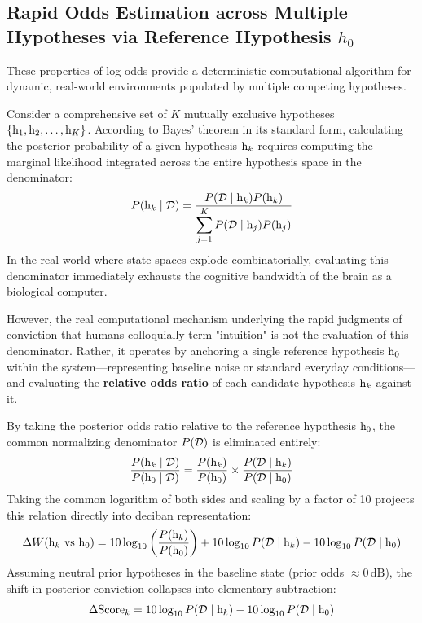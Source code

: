     \subsection{Rapid Odds Estimation across Multiple Hypotheses via Reference Hypothesis $h_0$}

    These properties of log-odds provide a deterministic computational algorithm for dynamic, real-world environments populated by multiple competing hypotheses.

    Consider a comprehensive set of $K$ mutually exclusive hypotheses $\{\mathrm{h}_1, \mathrm{h}_2, \dots, \mathrm{h}_K\}$. According to Bayes' theorem in its standard form, calculating the posterior probability of a given hypothesis $\mathrm{h}_k$ requires computing the marginal likelihood integrated across the entire hypothesis space in the denominator:
    \begin{equation}
        P(\mathrm{h}_k \mid \mathcal{D}) = \frac{P(\mathcal{D} \mid \mathrm{h}_k) P(\mathrm{h}_k)}{\displaystyle\sum_{j=1}^K P(\mathcal{D} \mid \mathrm{h}_j) P(\mathrm{h}_j)}
    \end{equation}
    In the real world where state spaces explode combinatorially, evaluating this denominator immediately exhausts the cognitive bandwidth of the brain as a biological computer.

    However, the real computational mechanism underlying the rapid judgments of conviction that humans colloquially term "intuition" is not the evaluation of this denominator. Rather, it operates by anchoring a single reference hypothesis $\mathrm{h}_0$ within the system—representing baseline noise or standard everyday conditions—and evaluating the \textbf{relative odds ratio} of each candidate hypothesis $\mathrm{h}_k$ against it.

    By taking the posterior odds ratio relative to the reference hypothesis $\mathrm{h}_0$, the common normalizing denominator $P(\mathcal{D})$ is eliminated entirely:
    \begin{equation}
        \frac{P(\mathrm{h}_k \mid \mathcal{D})}{P(\mathrm{h}_0 \mid \mathcal{D})} = \frac{P(\mathrm{h}_k)}{P(\mathrm{h}_0)} \times \frac{P(\mathcal{D} \mid \mathrm{h}_k)}{P(\mathcal{D} \mid \mathrm{h}_0)}
    \end{equation}
    Taking the common logarithm of both sides and scaling by a factor of 10 projects this relation directly into deciban representation:
    \begin{equation}
        \Delta W(\mathrm{h}_k \text{ vs } \mathrm{h}_0) = 10 \log_{10}\left(\frac{P(\mathrm{h}_k)}{P(\mathrm{h}_0)}\right) + 10 \log_{10} P(\mathcal{D} \mid \mathrm{h}_k) - 10 \log_{10} P(\mathcal{D} \mid \mathrm{h}_0)
    \end{equation}
    Assuming neutral prior hypotheses in the baseline state (prior odds $\approx 0\,\text{dB}$), the shift in posterior conviction collapses into elementary subtraction:
    \begin{equation}
        \Delta \text{Score}_k = 10 \log_{10} P(\mathcal{D} \mid \mathrm{h}_k) - 10 \log_{10} P(\mathcal{D} \mid \mathrm{h}_0)
    \end{equation}

